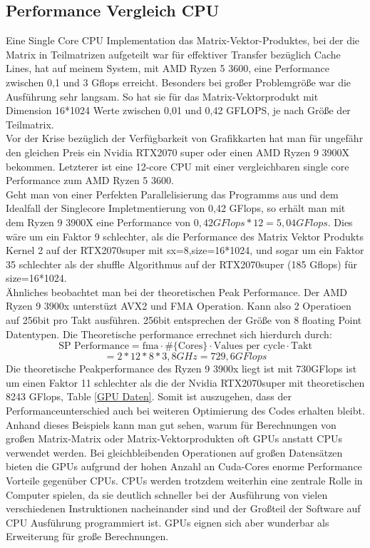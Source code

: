 \documentclass[10pt,a4paper]{article}
\begin{document}
	  \subsection{Performance Vergleich CPU}
	  Eine Single Core CPU Implementation das Matrix-Vektor-Produktes, bei der die Matrix in Teilmatrizen aufgeteilt war für effektiver Transfer bezüglich Cache Lines, hat auf meinem System, mit AMD Ryzen 5 3600, eine Performance zwischen 0,1 und 3 Gflops erreicht. Besonders bei großer Problemgröße war die Ausführung sehr langsam. So hat sie für das Matrix-Vektorprodukt mit Dimension 16*1024 Werte zwischen 0,01 und 0,42 GFLOPS, je nach Größe der Teilmatrix.\\ 
	  Vor der Krise bezüglich der Verfügbarkeit von Grafikkarten hat man für ungefähr den gleichen Preis ein Nvidia RTX2070 super oder einen AMD Ryzen 9 3900X bekommen. Letzterer ist eine 12-core CPU mit einer vergleichbaren single core Performance zum AMD Ryzen 5 3600. \\
	  Geht man von einer Perfekten Parallelisierung das Programms aus und dem Idealfall der Singlecore Impletmentierung von 0,42 GFlops, so erhält man mit dem Ryzen 9 3900X eine Performance von $0,42GFlops*12=5,04 GFlops$. Dies wäre um ein Faktor 9 schlechter, als die Performance des Matrix Vektor Produkts Kernel 2 auf der RTX2070super mit sx=8,size=16*1024, und sogar um ein Faktor 35 schlechter als der shuffle Algorithmus auf der RTX2070super (185 Gflops) für size=16*1024.\\
	  Ähnliches beobachtet man bei der theoretischen Peak Performance. Der AMD Ryzen 9 3900x  unterstüzt AVX2 und FMA Operation. Kann also 2 Operatioen auf 256bit pro Takt ausführen. 256bit entsprechen der Größe von 8 floating Point Datentypen. Die Theoretische performance errechnet sich hierdurch durch:
	  $$\text{SP Performance}=\text{fma}\cdot \#\{\text{Cores}\}\cdot\text{Values per cycle}\cdot \text{Takt}$$ $$=2*12*8*3,8GHz=729,6 GFlops$$
	  Die theoretische Peakperformance des Ryzen 9 3900x liegt ist mit 730GFlops ist um einen Faktor 11 schlechter als die der Nvidia RTX2070super mit theoretischen 8243 GFlops, Table \ref{GPU Daten}. Somit ist auszugehen, dass der Performanceunterschied auch bei weiteren Optimierung des Codes erhalten bleibt. \\ 
	   Anhand dieses Beispiels kann man gut sehen, warum für Berechnungen von großen Matrix-Matrix oder Matrix-Vektorprodukten oft GPUs anstatt CPUs verwendet werden. Bei gleichbleibenden Operationen auf großen Datensätzen bieten die GPUs aufgrund der hohen Anzahl an Cuda-Cores enorme Performance Vorteile gegenüber CPUs. CPUs werden trotzdem weiterhin eine zentrale Rolle in Computer spielen, da sie deutlich schneller bei der Ausführung von vielen verschiedenen Instruktionen nacheinander sind und der Großteil der Software auf CPU Ausführung programmiert ist. GPUs eignen sich aber wunderbar als Erweiterung für große Berechnungen.
\end{document}
